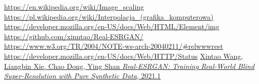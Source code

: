 \documentclass[polish,12pt,twoside,a4paper]{report}
\begin{document}

\newpage

\newpage

\begin{thebibliography}{6}

 \href{https://en.wikipedia.org/wiki/Image\_scaling}{https://en.wikipedia.org/wiki/Image\_scaling}
 \href{https://pl.wikipedia.org/wiki/Interpolacja\_(grafika\_komputerowa)}{https://pl.wikipedia.org/wiki/Interpolacja\_(grafika\_komputerowa)}
 \href{https://developer.mozilla.org/en-US/docs/Web/HTML/Element/img}{https://developer.mozilla.org/en-US/docs/Web/HTML/Element/img}
 \href{https://github.com/xinntao/Real-ESRGAN/}{https://github.com/xinntao/Real-ESRGAN/}
 \href{https://www.w3.org/TR/2004/NOTE-ws-arch-20040211/\#relwwwrest}{https://www.w3.org/TR/2004/NOTE-ws-arch-20040211/\#relwwwrest}
 \href{https://developer.mozilla.org/en-US/docs/Web/HTTP/Status}{https://developer.mozilla.org/en-US/docs/Web/HTTP/Status}
\href{https://paperswithcode.com/paper/real-esrgan-training-real-world-blind-super}{Xintao Wang, Liangbin Xie, Chao Dong, Ying Shan {\it Real-ESRGAN: Training Real-World Blind Super-Resolution with Pure Synthetic Data}, 2021.1}
\end{thebibliography}
\newpage


\end{document}
